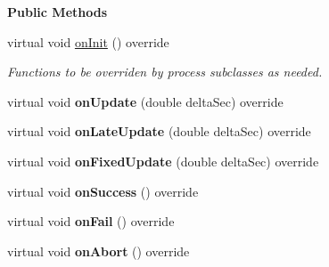 \begin{Indent}\textbf{ Public Methods}\par
\begin{DoxyCompactItemize}
\item 
\mbox{\label{classrev_1_1_animation_process_abb8512020d3d47ebda67e2f68f9679f4}} 
virtual void \mbox{\hyperlink{classrev_1_1_animation_process_abb8512020d3d47ebda67e2f68f9679f4}{on\+Init}} () override
\begin{DoxyCompactList}\small\item\em Functions to be overriden by process subclasses as needed. \end{DoxyCompactList}\item 
\mbox{\label{classrev_1_1_animation_process_a98dee6b8ff5159610d5a6cc278b2e05a}} 
virtual void {\bfseries on\+Update} (double delta\+Sec) override
\item 
\mbox{\label{classrev_1_1_animation_process_ac2f9181b3920d452a55c62961c5dd026}} 
virtual void {\bfseries on\+Late\+Update} (double delta\+Sec) override
\item 
\mbox{\label{classrev_1_1_animation_process_a5f80b828058721c03f644a4ace25648c}} 
virtual void {\bfseries on\+Fixed\+Update} (double delta\+Sec) override
\item 
\mbox{\label{classrev_1_1_animation_process_a53fe05262da4e6303facbb33f9500964}} 
virtual void {\bfseries on\+Success} () override
\item 
\mbox{\label{classrev_1_1_animation_process_a63879d0bcfa3d8758beb357111086d84}} 
virtual void {\bfseries on\+Fail} () override
\item 
\mbox{\label{classrev_1_1_animation_process_a9840df249db9cf5af2c7a3fd01d1e4b5}} 
virtual void {\bfseries on\+Abort} () override
\end{DoxyCompactItemize}
\end{Indent}
